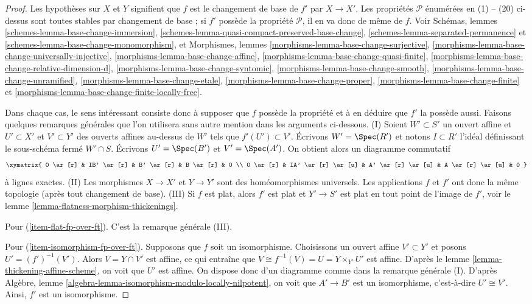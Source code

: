 \begin{proof}
Les hypothèses sur $X$ et $Y$ signifient que $f$ est le changement de base de
$f'$ par $X \to X'$.
Les propriétés $\mathcal{P}$ énumérées en (1) -- (20) ci-dessus sont toutes stables
par changement de base ; si $f'$ possède la propriété $\mathcal{P}$,
il en va donc de même de $f$. Voir
Schémas, lemmes \ref{schemes-lemma-base-change-immersion},
\ref{schemes-lemma-quasi-compact-preserved-base-change},
\ref{schemes-lemma-separated-permanence} et
\ref{schemes-lemma-base-change-monomorphism},
et
Morphismes, lemmes
\ref{morphisms-lemma-base-change-surjective},
\ref{morphisms-lemma-base-change-universally-injective},
\ref{morphisms-lemma-base-change-affine},
\ref{morphisms-lemma-base-change-quasi-finite},
\ref{morphisms-lemma-base-change-relative-dimension-d},
\ref{morphisms-lemma-base-change-syntomic},
\ref{morphisms-lemma-base-change-smooth},
\ref{morphisms-lemma-base-change-unramified},
\ref{morphisms-lemma-base-change-etale},
\ref{morphisms-lemma-base-change-proper},
\ref{morphisms-lemma-base-change-finite} et
\ref{morphisms-lemma-base-change-finite-locally-free}.

\medskip\noindent
Dans chaque cas, le sens intéressant consiste donc à supposer
que $f$ possède la propriété et à en déduire que $f'$ la possède aussi.
Faisons quelques remarques générales que l'on utilisera sans autre
mention dans les arguments ci-dessous.
(I) Soient $W' \subset S'$ un ouvert affine et $U' \subset X'$
et $V' \subset Y'$ des ouverts affines au-dessus de $W'$ tels que $f'(U') \subset V'$.
Écrivons $W' = \Spec(R')$ et notons $I \subset R'$ l'idéal
définissant le sous-schéma fermé $W' \cap S$. Écrivons $U' = \Spec(B')$
et $V' = \Spec(A')$. On obtient alors un diagramme commutatif
$$
\xymatrix{
0 \ar[r] &
IB' \ar[r] &
B' \ar[r] &
B \ar[r] & 0 \\
0 \ar[r] &
IA' \ar[r] \ar[u] &
A' \ar[r] \ar[u] &
A \ar[r] \ar[u] & 0
}
$$
à lignes exactes.
(II) Les morphismes $X \to X'$ et $Y \to Y'$ sont des homéomorphismes universels.
Les applications $f$ et $f'$ ont donc la même topologie (après tout changement de base).
(III) Si $f$ est plat, alors $f'$ est plat et $Y' \to S'$ est plat en tout
point de l'image de $f'$, voir
le lemme \ref{lemma-flatness-morphism-thickenings}.

\medskip\noindent
Pour (\ref{item-flat-fp-over-ft}). C'est la remarque générale (III).

\medskip\noindent
Pour (\ref{item-isomorphism-fp-over-ft}). Supposons que $f$ soit un isomorphisme.
Choisissons un ouvert affine $V' \subset Y'$ et posons $U' = (f')^{-1}(V')$.
Alors $V = Y \cap V'$ est affine, ce qui entraîne que
$V \cong f^{-1}(V) = U = Y \times_{Y'} U'$ est affine. D'après
le lemme \ref{lemma-thickening-affine-scheme},
on voit que $U'$ est affine. On dispose donc d'un diagramme comme dans
la remarque générale (I). D'après Algèbre, lemme
\ref{algebra-lemma-isomorphism-modulo-locally-nilpotent},
on voit que $A' \to B'$ est un isomorphisme, c'est-à-dire $U' \cong V'$.
Ainsi, $f'$ est un isomorphisme.


\end{proof}
